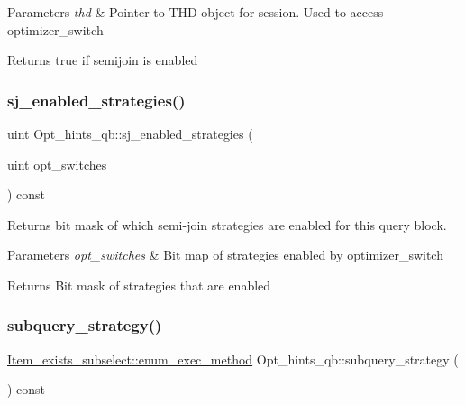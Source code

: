 \begin{DoxyParams}{Parameters}
{\em thd} & Pointer to T\+HD object for session. Used to access optimizer\+\_\+switch\\
\hline
\end{DoxyParams}
\begin{DoxyReturn}{Returns}
true if semijoin is enabled 
\end{DoxyReturn}
\mbox{\label{classOpt__hints__qb_a566ed5ba6a0666c607639f27d0d04cce}} 
\subsubsection{\texorpdfstring{sj\+\_\+enabled\+\_\+strategies()}{sj\_enabled\_strategies()}}
{\footnotesize\ttfamily uint Opt\+\_\+hints\+\_\+qb\+::sj\+\_\+enabled\+\_\+strategies (\begin{DoxyParamCaption}\item[{uint}]{opt\+\_\+switches }\end{DoxyParamCaption}) const}

Returns bit mask of which semi-\/join strategies are enabled for this query block.


\begin{DoxyParams}{Parameters}
{\em opt\+\_\+switches} & Bit map of strategies enabled by optimizer\+\_\+switch\\
\hline
\end{DoxyParams}
\begin{DoxyReturn}{Returns}
Bit mask of strategies that are enabled 
\end{DoxyReturn}
\mbox{\label{classOpt__hints__qb_a32ec634d8d4f0bc5fe08b46fd28e1772}} 
\subsubsection{\texorpdfstring{subquery\+\_\+strategy()}{subquery\_strategy()}}
{\footnotesize\ttfamily \mbox{\hyperlink{classItem__exists__subselect_aa110ca13dba0d9c620f5f72e6bad798e}{Item\+\_\+exists\+\_\+subselect\+::enum\+\_\+exec\+\_\+method}} Opt\+\_\+hints\+\_\+qb\+::subquery\+\_\+strategy (\begin{DoxyParamCaption}{ }\end{DoxyParamCaption}) const}

